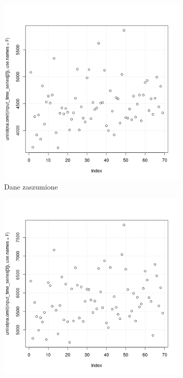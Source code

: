 \documentclass[11pt]{report}
\begin{document}
\begin{figure}[!t]
    \begin{subfigure}{.5\textwidth}
        \centering
        \includegraphics[width=.9\linewidth]{plot2.png}
        \caption{Dane zaszumione}
        \label{fig:sfig1}
    \end{subfigure}
    \begin{subfigure}{.5\textwidth}
        \centering
        \includegraphics[width=.9\linewidth]{plot3.png}

\end{subfigure}
\end{figure}
\end{document}
